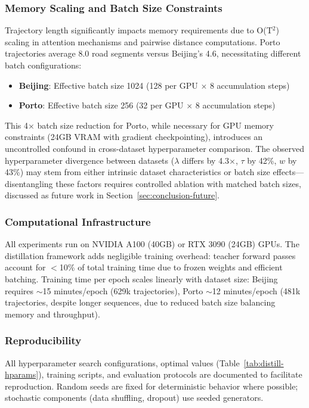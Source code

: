 \subsubsection{Memory Scaling and Batch Size Constraints}

Trajectory length significantly impacts memory requirements due to O(T$^2$) scaling in attention mechanisms and pairwise distance computations. Porto trajectories average 8.0 road segments versus Beijing's 4.6, necessitating different batch configurations:

\begin{itemize}[noitemsep,topsep=0pt]
    \item \textbf{Beijing}: Effective batch size 1024 (128 per GPU $\times$ 8 accumulation steps)
    \item \textbf{Porto}: Effective batch size 256 (32 per GPU $\times$ 8 accumulation steps)
\end{itemize}

This 4$\times$ batch size reduction for Porto, while necessary for GPU memory constraints (24GB VRAM with gradient checkpointing), introduces an uncontrolled confound in cross-dataset hyperparameter comparison. The observed hyperparameter divergence between datasets ($\lambda$ differs by 4.3$\times$, $\tau$ by 42\%, $w$ by 43\%) may stem from either intrinsic dataset characteristics or batch size effects---disentangling these factors requires controlled ablation with matched batch sizes, discussed as future work in Section~\ref{sec:conclusion-future}.

\subsubsection{Computational Infrastructure}

All experiments run on NVIDIA A100 (40GB) or RTX 3090 (24GB) GPUs. The distillation framework adds negligible training overhead: teacher forward passes account for $<$10\% of total training time due to frozen weights and efficient batching. Training time per epoch scales linearly with dataset size: Beijing requires $\sim$15 minutes/epoch (629k trajectories), Porto $\sim$12 minutes/epoch (481k trajectories, despite longer sequences, due to reduced batch size balancing memory and throughput).

\subsubsection{Reproducibility}

All hyperparameter search configurations, optimal values (Table~\ref{tab:distill-hparams}), training scripts, and evaluation protocols are documented to facilitate reproduction. Random seeds are fixed for deterministic behavior where possible; stochastic components (data shuffling, dropout) use seeded generators.

